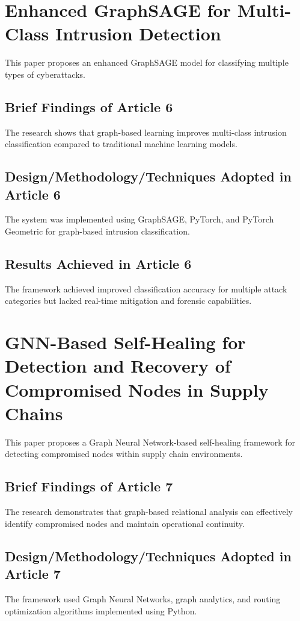 \documentclass[12pt,a4paper]{report}
\begin{document}
\section{Enhanced GraphSAGE for Multi-Class Intrusion Detection \cite{paper6}}
This paper proposes an enhanced GraphSAGE model for classifying multiple types of cyberattacks.

\subsection{Brief Findings of Article 6}
The research shows that graph-based learning improves multi-class intrusion classification compared to traditional machine learning models.

\subsection{Design/Methodology/Techniques Adopted in Article 6}
The system was implemented using GraphSAGE, PyTorch, and PyTorch Geometric for graph-based intrusion classification.

\subsection{Results Achieved in Article 6}
The framework achieved improved classification accuracy for multiple attack categories but lacked real-time mitigation and forensic capabilities.

\section{GNN-Based Self-Healing for Detection and Recovery of Compromised Nodes in Supply Chains \cite{paper7}}
This paper proposes a Graph Neural Network-based self-healing framework for detecting compromised nodes within supply chain environments.

\subsection{Brief Findings of Article 7}
The research demonstrates that graph-based relational analysis can effectively identify compromised nodes and maintain operational continuity.

\subsection{Design/Methodology/Techniques Adopted in Article 7}
The framework used Graph Neural Networks, graph analytics, and routing optimization algorithms implemented using Python.
\end{document}
